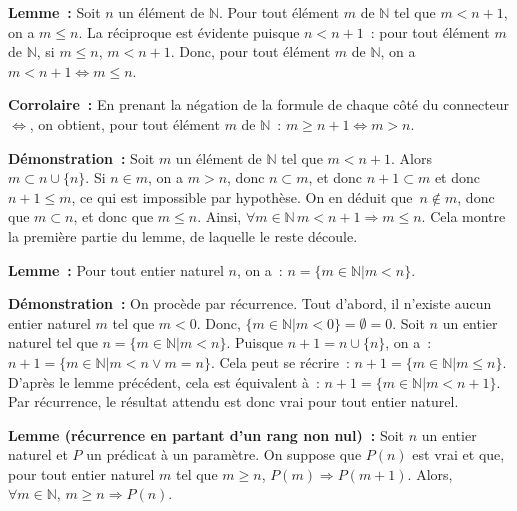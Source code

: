 \medskip

\noindent\textbf{Lemme :} 
    Soit $n$ un élément de $\mathbb{N}$. 
    Pour tout élément $m$ de $\mathbb{N}$ tel que $m < n+1$, on a $m \leq n$. 
    La réciproque est évidente puisque $n < n+1$ : pour tout élément $m$ de $\mathbb{N}$, si $m \leq n$, $m < n+1$. 
    Donc, pour tout élément $m$ de $\mathbb{N}$, on a $m < n+1 \Leftrightarrow m \leq n$. 

\medskip

\noindent\textbf{Corrolaire :} 
    En prenant la négation de la formule de chaque côté du connecteur $\Leftrightarrow$, on obtient, pour tout élément $m$ de $\mathbb{N}$ : $m \geq n+1 \Leftrightarrow m > n$.

\medskip

\noindent\textbf{Démonstration :} 
    Soit $m$ un élément de $\mathbb{N}$ tel que $m < n+1$. 
    Alors $m \subset n \cup \lbrace n \rbrace$. 
    Si $n \in m$, on a $m > n$, donc $n \subset m$, et donc $n+1 \subset m$ et donc $n+1 \leq m$, ce qui est impossible par hypothèse. 
    On en déduit que $n \notin m$, donc que $m \subset n$, et donc que $m \leq n$. 
    Ainsi, $\forall m \in \mathbb{N}\, m < n+1 \Rightarrow m \leq n$. 
    Cela montre la première partie du lemme, de laquelle le reste découle. 
    
   \done 

\medskip

\noindent\textbf{Lemme :} 
    Pour tout entier naturel $n$, on a : $n = \lbrace m \in \mathbb{N} \vert m < n \rbrace$. 

\medskip

\noindent\textbf{Démonstration :} 
    On procède par récurrence. 
    Tout d'abord, il n'existe aucun entier naturel $m$ tel que $m < 0$. 
    Donc, $\lbrace m \in \mathbb{N} \vert m < 0 \rbrace = \emptyset = 0$. 
    Soit $n$ un entier naturel tel que $n = \lbrace m \in \mathbb{N} \vert m < n \rbrace$. 
    Puisque $n+1 = n \cup \lbrace n \rbrace$, on a : $n + 1 = \lbrace m \in \mathbb{N} \vert m < n \vee m = n \rbrace$. 
    Cela peut se récrire : $n + 1 = \lbrace m \in \mathbb{N} \vert m \leq n \rbrace$. 
    D'après le lemme précédent, cela est équivalent à : $n + 1 = \lbrace m \in \mathbb{N} \vert m < n + 1 \rbrace$. 
    Par récurrence, le résultat attendu est donc vrai pour tout entier naturel.
    
   \done 

\medskip

\noindent\textbf{Lemme (récurrence en partant d'un rang non nul) :} 
    Soit $n$ un entier naturel et $P$ un prédicat à un paramètre. 
    On suppose que $P(n)$ est vrai et que, pour tout entier naturel $m$ tel que $m \geq n$, $P(m) \Rightarrow P(m+1)$. 
    Alors, $\forall m \in \mathbb{N}, \, m \geq n \Rightarrow P(n)$.

